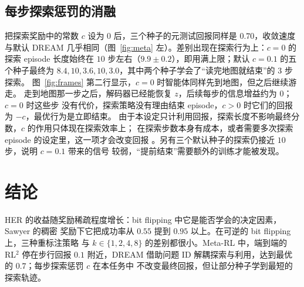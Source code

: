 \documentclass[10pt,twocolumn,a4paper]{ctexart}
\begin{document}
\subsection{每步探索惩罚的消融}
把探索奖励中的常数 $c$ 设为 $0$ 后，三个种子的元测试回报同样是 $0.70$，收敛速度与默认
DREAM 几乎相同（图~\ref{fig:meta} 左）。差别出现在探索行为上：$c=0$ 的探索 episode
长度始终在 $10$ 步左右（$9.9\pm0.2$），即用满上限；默认 $c=0.1$ 的五个种子最终为
$8.4,10,3.6,10,3.0$，其中两个种子学会了“读完地图就结束”的 $3$ 步探索。
图~\ref{fig:frames} 第二行显示，$c=0$ 时智能体同样先到地图，但之后继续游走。
走到地图那一步之后，解码器已经能恢复 $z$，后续每步的信息增益约为 $0$；$c=0$ 时这些步
没有代价，探索策略没有理由结束 episode，$c>0$ 时它们的回报为 $-c$，最优行为是立即结束。
由于本设定只计利用回报，探索长度不影响最终分数，$c$ 的作用只体现在探索效率上；
在探索步数本身有成本，或者需要多次探索 episode 的设定里，这一项才会改变回报
\citep{liu2021dream}。另有三个默认种子的探索仍接近 $10$ 步，说明 $c=0.1$ 带来的信号
较弱，“提前结束”需要额外的训练才能被发现。

\section{结论}
HER 的收益随奖励稀疏程度增长：bit flipping 中它是能否学会的决定因素，Sawyer 的稠密
奖励下它把成功率从 $0.55$ 提到 $0.95$ 以上。在可逆的 bit flipping 上，三种重标注策略
与 $k\in\{1,2,4,8\}$ 的差别都很小。Meta-RL 中，端到端的 RL$^2$ 停在步行回报 $0.1$
附近，DREAM 借助问题 ID 解耦探索与利用，达到最优的 $0.7$；每步探索惩罚 $c$ 在本任务中
不改变最终回报，但让部分种子学到最短的探索轨迹。

\clearpage


\end{document}
